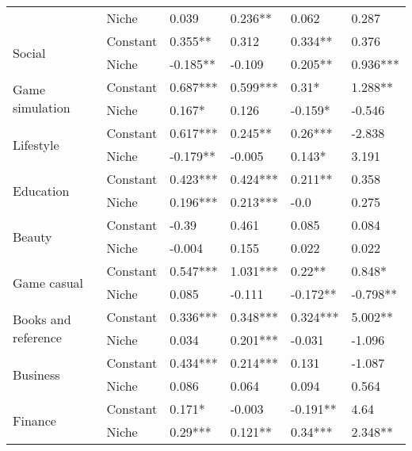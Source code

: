 \begin{longtable}[h!]{llllll}
          & Niche &               0.039 &     0.236** &      0.062 &      0.287 \\
\cline{1-6}
\multirow{2}{*}{Social} & Constant &             0.355** &       0.312 &    0.334** &      0.376 \\
          & Niche &            -0.185** &      -0.109 &    0.205** &   0.936*** \\
\cline{1-6}
\multirow{2}{*}{Game simulation} & Constant &            0.687*** &    0.599*** &      0.31* &    1.288** \\
          & Niche &              0.167* &       0.126 &    -0.159* &     -0.546 \\
\cline{1-6}
\multirow{2}{*}{Lifestyle} & Constant &            0.617*** &     0.245** &    0.26*** &     -2.838 \\
          & Niche &            -0.179** &      -0.005 &     0.143* &      3.191 \\
\cline{1-6}
\multirow{2}{*}{Education} & Constant &            0.423*** &    0.424*** &    0.211** &      0.358 \\
          & Niche &            0.196*** &    0.213*** &       -0.0 &      0.275 \\
\cline{1-6}
\multirow{2}{*}{Beauty} & Constant &               -0.39 &       0.461 &      0.085 &      0.084 \\
          & Niche &              -0.004 &       0.155 &      0.022 &      0.022 \\
\cline{1-6}
\multirow{2}{*}{Game casual} & Constant &            0.547*** &    1.031*** &     0.22** &     0.848* \\
          & Niche &               0.085 &      -0.111 &   -0.172** &   -0.798** \\
\cline{1-6}
\multirow{2}{*}{Books and reference} & Constant &            0.336*** &    0.348*** &   0.324*** &    5.002** \\
          & Niche &               0.034 &    0.201*** &     -0.031 &     -1.096 \\
\cline{1-6}
\multirow{2}{*}{Business} & Constant &            0.434*** &    0.214*** &      0.131 &     -1.087 \\
          & Niche &               0.086 &       0.064 &      0.094 &      0.564 \\
\cline{1-6}
\multirow{2}{*}{Finance} & Constant &              0.171* &      -0.003 &   -0.191** &       4.64 \\
          & Niche &             0.29*** &     0.121** &    0.34*** &    2.348** \\

\end{longtable}
